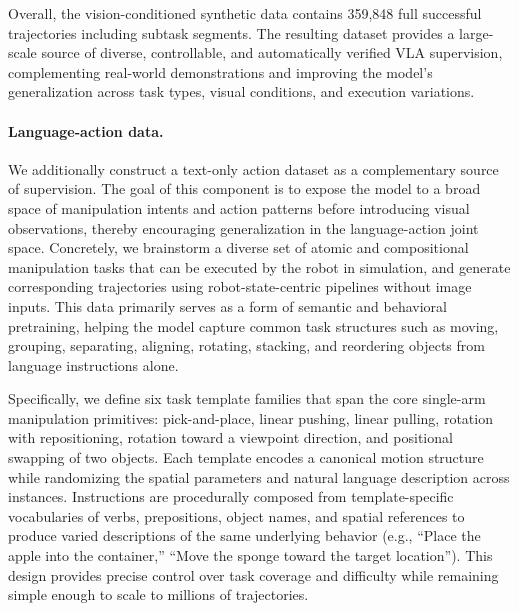 \documentclass{article}
\begin{document}
Overall, the vision-conditioned synthetic data contains 359,848 full successful trajectories including subtask segments. The resulting dataset provides a large-scale source of diverse, controllable, and automatically verified VLA supervision, complementing real-world demonstrations and improving the model's generalization across task types, visual conditions, and execution variations.

\paragraph{Language-action data.}
We additionally construct a text-only action dataset as a complementary source of supervision. The goal of this component is to expose the model to a broad space of manipulation intents and action patterns before introducing visual observations, thereby encouraging generalization in the language-action joint space. Concretely, we brainstorm a diverse set of atomic and compositional manipulation tasks that can be executed by the robot in simulation, and generate corresponding trajectories using robot-state-centric pipelines without image inputs. This data primarily serves as a form of semantic and behavioral pretraining, helping the model capture common task structures such as moving, grouping, separating, aligning, rotating, stacking, and reordering objects from language instructions alone.

Specifically, we define six task template families that span the core single-arm manipulation primitives: pick-and-place, linear pushing, linear pulling, rotation with repositioning, rotation toward a viewpoint direction, and positional swapping of two objects. Each template encodes a canonical motion structure while randomizing the spatial parameters and natural language description across instances. Instructions are procedurally composed from template-specific vocabularies of verbs, prepositions, object names, and spatial references to produce varied descriptions of the same underlying behavior (e.g., ``Place the apple into the container,'' ``Move the sponge toward the target location''). This design provides precise control over task coverage and difficulty while remaining simple enough to scale to millions of trajectories.
\end{document}
